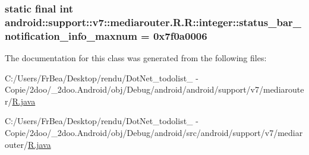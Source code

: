 \hypertarget{classandroid_1_1support_1_1v7_1_1mediarouter_1_1_r_1_1integer_ff00f3f598b87647057900ec7cd50328}{
\subsubsection[{status\_\-bar\_\-notification\_\-info\_\-maxnum}]{\setlength{\rightskip}{0pt plus 5cm}static final int android::support::v7::mediarouter.R.R::integer::status\_\-bar\_\-notification\_\-info\_\-maxnum = 0x7f0a0006}}
\label{classandroid_1_1support_1_1v7_1_1mediarouter_1_1_r_1_1integer_ff00f3f598b87647057900ec7cd50328}




The documentation for this class was generated from the following files:\begin{CompactItemize}
\item 
C:/Users/FrBea/Desktop/rendu/DotNet\_\-todolist\_ - Copie/2doo/\_\-2doo.Android/obj/Debug/android/android/support/v7/mediarouter/\hyperlink{android_2support_2v7_2mediarouter_2_r_8java}{R.java}\item 
C:/Users/FrBea/Desktop/rendu/DotNet\_\-todolist\_ - Copie/2doo/\_\-2doo.Android/obj/Debug/android/src/android/support/v7/mediarouter/\hyperlink{src_2android_2support_2v7_2mediarouter_2_r_8java}{R.java}\end{CompactItemize}
